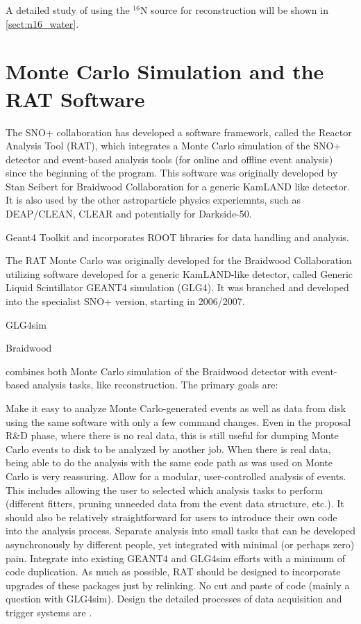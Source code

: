 
A detailed study of using the $^{16}$N source for reconstruction will be shown in \ref{sect:n16_water}.



\section{Monte Carlo Simulation and the RAT Software}
The SNO+ collaboration has developed a software framework, called the Reactor Analysis
Tool (RAT), which integrates a Monte Carlo simulation of the SNO+ detector and event-based analysis tools (for online and offline event analysis) since the beginning of the program. This software was originally developed by Stan Seibert for Braidwood Collaboration for a generic KamLAND like detector. It is also used by the other astroparticle physics experiemnts, such as DEAP/CLEAN, CLEAR and potentially for Darkside-50\cite{rat}.

Geant4 Toolkit and
incorporates ROOT libraries for data handling and analysis.

The RAT Monte Carlo was originally developed for the Braidwood Collaboration
utilizing software developed for a generic KamLAND-like detector, called Generic Liquid Scintillator GEANT4 simulation (GLG4). It was branched and
developed into the specialist SNO+ version, starting in 2006/2007.

GLG4sim


Braidwood

combines both Monte Carlo simulation of the Braidwood detector with event-based analysis tasks, like reconstruction. The primary goals are:

Make it easy to analyze Monte Carlo-generated events as well as data from disk using the same software with only a few command changes. Even in the proposal R\&D phase, where there is no real data, this is still useful for dumping Monte Carlo events to disk to be analyzed by another job. When there is real data, being able to do the analysis with the same code path as was used on Monte Carlo is very reassuring.
Allow for a modular, user-controlled analysis of events. This includes allowing the user to selected which analysis tasks to perform (different fitters, pruning unneeded data from the event data structure, etc.). It should also be relatively straightforward for users to introduce their own code into the analysis process.
Separate analysis into small tasks that can be developed asynchronously by different people, yet integrated with minimal (or perhaps zero) pain.
Integrate into existing GEANT4 and GLG4sim efforts with a minimum of code duplication. As much as possible, RAT should be designed to incorporate upgrades of these packages just by relinking. No cut and paste of code (mainly a question with GLG4sim).
Design the detailed processes of data acquisition and trigger systems are \cite{whitepaper}.

